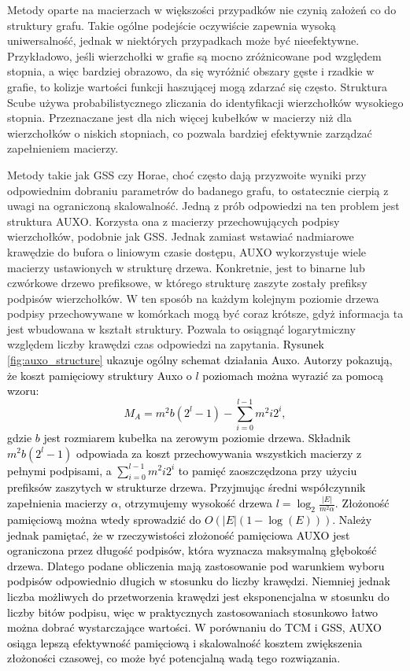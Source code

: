     Metody oparte na macierzach w większości przypadków nie czynią założeń co do struktury grafu. Takie ogólne podejście oczywiście zapewnia wysoką uniwersalność, jednak w niektórych przypadkach może być nieefektywne. Przykładowo, jeśli wierzchołki w grafie są mocno zróżnicowane pod względem stopnia, a więc bardziej obrazowo, da się wyróżnić obszary gęste i rzadkie w grafie, to kolizje wartości funkcji haszującej mogą zdarzać się często. Struktura Scube\cite{Chen_Zhou_Chen_Jin_2022} używa probabilistycznego zliczania do identyfikacji wierzchołków wysokiego stopnia. Przeznaczane jest dla nich więcej kubełków w macierzy niż dla wierzchołków o niskich stopniach, co pozwala bardziej efektywnie zarządzać zapełnieniem macierzy. 

    Metody takie jak GSS czy Horae, choć często dają przyzwoite wyniki przy odpowiednim dobraniu parametrów do badanego grafu, to ostatecznie cierpią z uwagi na ograniczoną skalowalność. Jedną z prób odpowiedzi na ten problem jest struktura AUXO\cite{Jiang_Chen_Jin_2023}. Korzysta ona z macierzy przechowujących podpisy wierzchołków, podobnie jak GSS. Jednak zamiast wstawiać nadmiarowe krawędzie do bufora o liniowym czasie dostępu, AUXO wykorzystuje wiele macierzy ustawionych w strukturę drzewa. Konkretnie, jest to binarne lub czwórkowe drzewo prefiksowe, w którego strukturę zaszyte zostały prefiksy podpisów wierzchołków. W ten sposób na każdym kolejnym poziomie drzewa podpisy przechowywane w komórkach mogą być coraz krótsze, gdyż informacja ta jest wbudowana w kształt struktury. Pozwala to osiągnąć logarytmiczny względem liczby krawędzi czas odpowiedzi na zapytania. \textcolor{black}{Rysunek \ref{fig:auxo_structure} ukazuje ogólny schemat działania Auxo. Autorzy pokazują, że koszt pamięciowy struktury Auxo o $l$ poziomach można wyrazić za pomocą wzoru:
    \[
        M_A = m^2b(2^l - 1) - \sum\limits_{i = 0}^{l - 1} m^2 i 2^i,
    \]
    gdzie $b$ jest rozmiarem kubełka na zerowym poziomie drzewa. Składnik $m^2b(2^l - 1)$ odpowiada za koszt przechowywania wszystkich macierzy z pełnymi podpisami, a $\sum\limits_{i = 0}^{l - 1} m^2 i 2^i$ to pamięć zaoszczędzona przy użyciu prefiksów zaszytych  w strukturze drzewa. Przyjmując średni współczynnik zapełnienia macierzy $\alpha$, otrzymujemy wysokość drzewa $l = \log_{2} \frac{\vert E \vert}{m^2 \alpha}$. Złożoność pamięciową można wtedy sprowadzić do $O(|E|(1 - \log(E)))$. Należy jednak pamiętać, że w rzeczywistości złożoność pamięciowa AUXO jest ograniczona przez długość podpisów, która wyznacza maksymalną głębokość drzewa. Dlatego podane obliczenia mają zastosowanie pod warunkiem wyboru podpisów odpowiednio długich w stosunku do liczby krawędzi. Niemniej jednak liczba możliwych do przetworzenia krawędzi jest eksponencjalna w stosunku do liczby bitów podpisu, więc w praktycznych zastosowaniach stosunkowo łatwo można dobrać wystarczające wartości. W porównaniu do TCM i GSS, AUXO osiąga lepszą efektywność pamięciową i skalowalność kosztem zwiększenia złożoności czasowej, co może być potencjalną wadą tego rozwiązania.}

